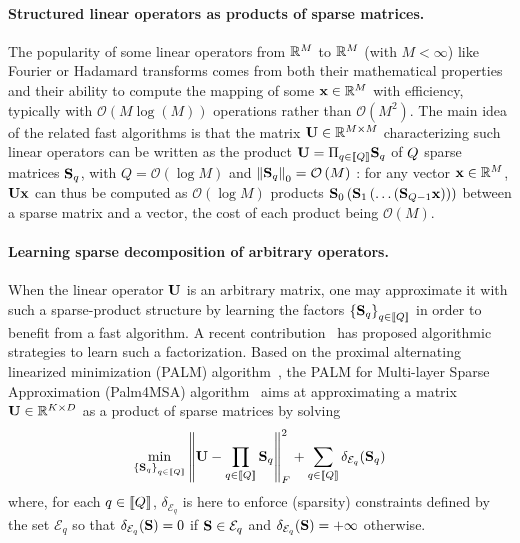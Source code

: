 \paragraph{Structured linear operators as products of sparse matrices.}
The popularity of some linear operators from $\mathbb{R}^{M}$ to $\mathbb{R}^{M}$ (with $M<\infty$)
 like Fourier or Hadamard transforms comes from both their mathematical 
 properties and their ability to compute the mapping of some ${\mathbf{x}}\in\mathbb{R}^M$ with efficiency, typically with $\mathcal{O}\left (M\log\left (M\right )\right )$ operations rather than 
 $\mathcal{O}\left (M^2\right)$. 
The main idea of the related fast algorithms is that the matrix ${\mathbf{U}}\in{\mathbb{R}}^{M\times M}$ characterizing such linear operators can be written as the product ${\mathbf{U}}=\Pi_{q\in\left \llbracket Q\right \rrbracket}{\mathbf{S}}_q$ of $Q$ sparse matrices ${\mathbf{S}}_q$, with $Q=\mathcal{O}\left (\log M\right )$ and $\left \|{\mathbf{S}}_q\right \|_0=\mathcal{O}\left (M\right )$ \cite{LeMagoarou2016Flexible,Morgenstern:1975:LCC:321879.321881}:
for any vector ${\mathbf{x}}\in{\mathbb{R}}^M$, ${\mathbf{U}}{\mathbf{x}}$ can thus be computed as $\mathcal{O}\left (\log M\right )$ products ${\mathbf{S}}_0 \left ({\mathbf{S}}_1 \left (\ldots \left ({\mathbf{S}}_{Q-1}{\mathbf{x}}\right )\right )\right )$ between a sparse matrix and a vector, the cost of each product being $\mathcal{O}\left (M\right )$.

\paragraph{Learning sparse decomposition of arbitrary operators.} When the linear operator ${\mathbf{U}}$ is an arbitrary matrix, one may approximate it with such a sparse-product structure by learning the factors $\left \lbrace{\mathbf{S}}_q\right \rbrace_{q\in\left \llbracket Q\right \rrbracket}$ in order to benefit from a fast algorithm.
A recent contribution~\cite{LeMagoarou2016Flexible} has proposed algorithmic strategies to learn such a factorization. Based on the proximal alternating linearized minimization (PALM) algorithm~\cite{bolte2014proximal}, the PALM for Multi-layer Sparse Approximation (Palm4MSA) algorithm~\cite{LeMagoarou2016Flexible} aims at approximating a matrix ${\mathbf{U}}\in{\mathbb{R}}^{K\times D}$ as a product of sparse matrices by solving
\begin{align}
\label{eq:palm4msa}
\min_{\left \lbrace{\mathbf{S}}_q\right \rbrace_{q\in\left \llbracket Q\right \rrbracket}} \left \|{\mathbf{U}} -  \prod_{q\in\left \llbracket Q\right \rrbracket}{{\mathbf{S}}_q}\right \|_F^2 + \sum_{q\in\left \llbracket Q\right \rrbracket} \delta_{\mathcal{E}_q}({\mathbf{S}}_q)
\end{align}
where, for each $q\in\left \llbracket Q\right \rrbracket$, $\delta_{\mathcal{E}_q}$ is here to enforce (sparsity)
constraints defined by the set $\mathcal{E}_q$ so that $\delta_{\mathcal{E}_q}({\mathbf{S}})=0$ 
if ${\mathbf{S}} \in \mathcal{E}_q$ and $\delta_{\mathcal{E}_q}({\mathbf{S}})=+\infty$ otherwise.

